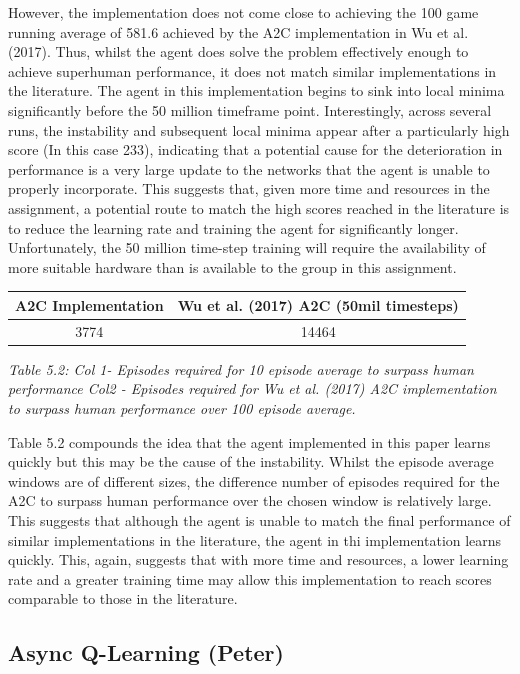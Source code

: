 \documentclass{article}
\begin{document}
However, the implementation does not come close to achieving the 100 game running average of 581.6 achieved by the A2C implementation in Wu et al. (2017). Thus, whilst the agent does solve the problem effectively enough to achieve superhuman performance, it does not match similar implementations in the literature. The agent in this implementation begins to sink into local minima significantly before the 50 million timeframe point. Interestingly, across several runs, the instability and subsequent local minima appear after a particularly high score (In this case 233), indicating that a potential cause for the deterioration in performance is a very large update to the networks that the agent is unable to properly incorporate. This suggests that, given more time and resources in the assignment, a potential route to match the high scores reached in the literature is to reduce the learning rate and training the agent for significantly longer. Unfortunately, the 50 million time-step training will require the availability of more suitable hardware than is available to the group in this assignment.

\begin{table}[h!]
\centering
\begin{tabular}{|c | c|} 
 \hline
 A2C Implementation & Wu et al. (2017) A2C (50mil timesteps) \\ [0.5ex] 
 \hline
 3774 & 14464   \\ 
 \hline
\end{tabular}
\end{table}
\emph{Table 5.2: Col 1- Episodes required for 10 episode average to surpass human performance Col2 - Episodes required for Wu et al. (2017) A2C implementation to surpass human performance over 100 episode average.}

Table 5.2 compounds the idea that the agent implemented in this paper learns quickly but this may be the cause of the instability. Whilst the episode average windows are of different sizes, the difference number of episodes required for the A2C to surpass human performance over the chosen window is relatively large. This suggests that although the agent is unable to match the final performance of similar implementations in the literature, the agent in thi implementation learns quickly. This, again, suggests that with more time and resources, a lower learning rate and a greater training time may allow this implementation to reach scores comparable to those in the literature.

\subsection{Async Q-Learning (Peter)}
\end{document}
